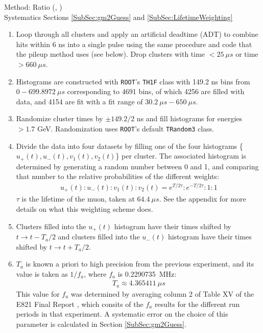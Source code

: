 	Method: Ratio (, \cite{DenverRatioTalk}) \\
	\noindent Systematics Sections \ref{SubSec:gm2Guess} and \ref{SubSec:LifetimeWeighting}

	\begin{enumerate}
		\item{Loop through all clusters and apply an artificial deadtime (ADT) to combine hits within 6 ns into a single pulse using the same procedure and code that the pileup method uses (see below). Drop clusters with time $< \SI{25}{\mu s}$ or time $> \SI{660}{\mu s}$.}
		\item{Histograms are constructed with \texttt{ROOT}'s \texttt{TH1F} class with 149.2 ns bins from $0 - \SI{699.8972}{\mu s}$ corresponding to 4691 bins, of which 4256 are filled with data, and 4154 are fit with a fit range of $\SI{30.2}{\mu s} - \SI{650}{\mu s}$.}
		\item{Randomize cluster times by $\pm 149.2/2$ ns and fill histograms for energies $> 1.7$ GeV. Randomization uses \texttt{ROOT}'s default \texttt{TRandom3} class.}
		\item{Divide the data into four datasets by filling one of the four histograms \{$u_{+}(t), u_{-}(t), v_{1}(t), v_{2}(t)$\} per cluster. The associated histogram is determined by generating a random number between 0 and 1, and comparing that number to the relative probabilities of the different weights:
			\begin{align}
				u_{+}(t) : u_{-}(t) : v_{1}(t) : v_{2}(t) = e^{T/2\tau} : e^{-T/2\tau} : 1 : 1
			\end{align}
		$\tau$ is the lifetime of the muon, taken at $\SI{64.4}{\mu s}$. See the appendix for more details on what this weighting scheme does.}
		\item{Clusters filled into the $u_{+}(t)$ histogram have their times shifted by $t \rightarrow t - T_{a}/2$ and clusters filled into the $u_{-}(t)$ histogram have their times shifted by $t \rightarrow t + T_{a}/2$.}
		\item{$T_{a}$ is known a priori to high precision from the previous experiment, and its value is taken as $1/f_{a}$, where $f_{a}$ is \SI{0.2290735}{MHz}:
			\begin{align}
				T_{a} \approx \SI{4.365411}{\mu s}
			\label{eq:Ta}
			\end{align}
		This value for $f_{a}$ was determined by averaging column 2 of Table XV of the E821 Final Report \cite{E821FinalReport}, which consits of the $f_{a}$ results for the different run periods in that experiment. A systematic error on the choice of this parameter is calculated in Section \ref{SubSec:gm2Guess}.}
	\end{enumerate}

